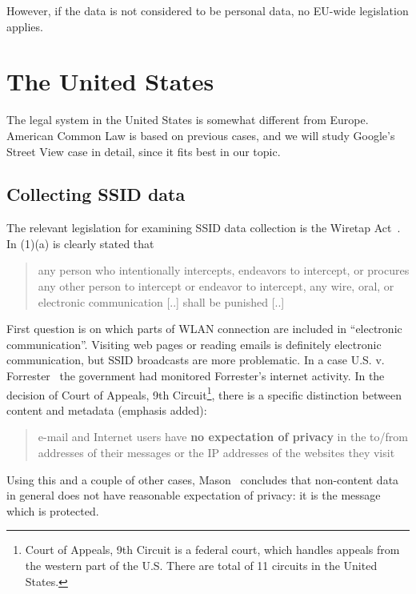\documentclass[12pt,a4paper,oneside,pdftex]{report}
\begin{document}
However, if the data is not considered to be personal data, no EU-wide legislation applies. 


\section{The United States}

The legal system in the United States is somewhat different from Europe. American Common Law is based on previous cases, and we will study Google's Street View case in detail, since it fits best in our topic.

\subsection{Collecting SSID data}
\label{subsec:us_collecting}

The relevant legislation for examining SSID data collection is the Wiretap Act~\cite{wiretap_act}. In (1)(a) is clearly stated that

\begin{quote}
    any person who intentionally intercepts, endeavors to intercept, or procures any other person to intercept or endeavor to intercept, any wire, oral, or electronic communication [..] shall be punished [..]
\end{quote}

First question is on which parts of WLAN connection are included in ``electronic communication''. Visiting web pages or reading emails is definitely electronic communication, but SSID broadcasts are more problematic. In a case U.S. v. Forrester~\cite{us_forrester} the government had monitored Forrester's internet activity. In the decision of Court of Appeals, 9th Circuit\footnote{Court of Appeals, 9th Circuit is a federal court, which handles appeals from the western part of the U.S. There are total of 11 circuits in the United States.}, there is a specific distinction between content and metadata (emphasis added):

\begin{quote}
    e-mail and Internet users have \textbf{no expectation of privacy} in the to/from addresses of their messages or the IP addresses of the websites they visit
\end{quote}

Using this and a couple of other cases, Mason~\cite{mason2014aligning} concludes that non-content data in general does not have reasonable expectation of privacy: it is the message which is protected. 
\end{document}

